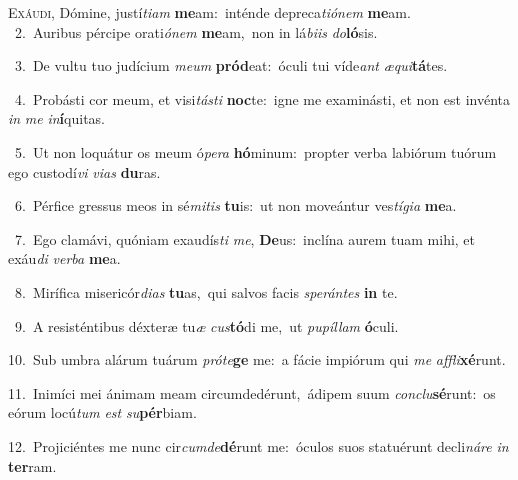 \lettrine{\initial\textcolor{\initialcolor}{E}}{xáudi,} Dómine, justí\-\textit{ti}\-\textit{am} \textbf{me}\-am:~\star inténde depreca\-\textit{ti}\-\textit{ó}\textit{nem} \textbf{me}\-am.\\
{\numbfont\textcolor{\numbcolor}{~2.}}~Auribus pércipe orati\-\textit{ó}\-\textit{nem} \textbf{me}\-am,~\star non in lá\-\textit{bi}\-\textit{is} \textit{do}\-\textbf{ló}sis.\par
{\numbfont\textcolor{\numbcolor}{~3.}}~De vultu tuo judícium \textit{me}\-\textit{um} \textbf{pród}\-eat:~\star óculi tui víde\textit{ant} \textit{æ}\-\textit{qui}\textbf{tá}tes.\par
{\numbfont\textcolor{\numbcolor}{~4.}}~Probásti cor meum, et visi\-\textit{tás}\-\textit{ti} \textbf{noc}\-te:~\star igne me examinásti, et non est invénta \textit{in} \textit{me} \textit{in}\-\textbf{í}quitas.\par
{\numbfont\textcolor{\numbcolor}{~5.}}~Ut non loquátur os meum ó\-\textit{pe}\-\textit{ra} \textbf{hó}\-minum:~\star propter verba labiórum tuórum ego custodí\textit{vi} \textit{vi}\-\textit{as} \textbf{du}\-ras.\par
{\numbfont\textcolor{\numbcolor}{~6.}}~Pérfice gressus meos in sé\-\textit{mi}\-\textit{tis} \textbf{tu}\-is:~\star ut non moveántur ves\-\textit{tí}\-\textit{gi}\textit{a} \textbf{me}\-a.\par
{\numbfont\textcolor{\numbcolor}{~7.}}~Ego clamávi, quóniam exaudís\textit{ti} \textit{me}\-, \textbf{De}\-us:~\star inclína aurem tuam mihi, et exáu\textit{di} \textit{ver}\-\textit{ba} \textbf{me}\-a.\par
{\numbfont\textcolor{\numbcolor}{~8.}}~Mirífica misericór\-\textit{di}\-\textit{as} \textbf{tu}\-as,~\star qui salvos facis \textit{spe}\-\textit{rán}\textit{tes} \textbf{in} te.\par
{\numbfont\textcolor{\numbcolor}{~9.}}~A resisténtibus déxteræ tu\textit{æ} \textit{cus}\-\textbf{tó}di me,~\star ut \textit{pu}\-\textit{píl}\textit{lam} \textbf{ó}\-culi.\par
{\numbfont\textcolor{\numbcolor}{10.}}~Sub umbra alárum tuárum \textit{pró}\-\textit{te}\textbf{ge} me:~\star a fácie impiórum qui \textit{me} \textit{af}\-\textit{fli}\textbf{xé}runt.\par
{\numbfont\textcolor{\numbcolor}{11.}}~Inimíci mei ánimam meam circumdedérunt,~\dagger ádipem suum \textit{con}\-\textit{clu}\textbf{sé}runt:~\star os eórum locú\textit{tum} \textit{est} \textit{su}\-\textbf{pér}biam.\par
{\numbfont\textcolor{\numbcolor}{12.}}~Projiciéntes me nunc cir\-\textit{cum}\-\textit{de}\textbf{dé}runt me:~\star óculos suos statuérunt decli\-\textit{ná}\-\textit{re} \textit{in} \textbf{ter}\-ram.\par
